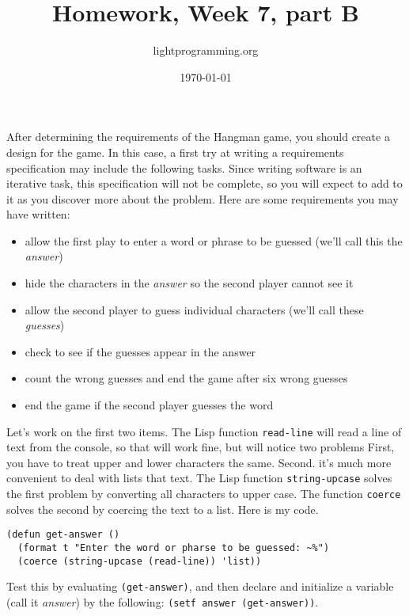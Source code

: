 \documentclass{article}
\title{Homework, Week 7, part B}
\author{lightprogramming.org}
\date{\today}
\begin{document}
\maketitle{}
\lstset{language=Lisp,numbers=left,keepspaces=false,basicstyle=\small,numberstyle=\tiny,breaklines=true,showstringspaces=false}

After determining the requirements of the Hangman game, you should create a design for the game. In this case, a first try at writing a requirements specification may include the following tasks. Since writing software is an iterative task, this specification will not be complete, so you will expect to add to it as you discover more about the problem. Here are some requirements you may have written:

\begin{itemize}
    \item allow the first play to enter a word or phrase to be guessed (we'll call this the \textit{answer})
    \item hide the characters in the \textit{answer} so the second player cannot see it
    \item allow the second player to guess individual characters (we'll call these \textit{guesses})
    \item check to see if the guesses appear in the answer
    \item count the wrong guesses and end the game after six wrong guesses
    \item end the game if the second player guesses the word
\end{itemize}

Let's work on the first two items. The Lisp function \texttt{read-line} will read a line of text from the console, so that will work fine, but will notice two problems First, you have to treat upper and lower characters the same. Second. it's much more convenient to deal with lists that text. The Lisp function \texttt{string-upcase} solves the first problem by converting all characters to upper case. The function \texttt{coerce} solves the second by coercing the text to a list. Here is my code. 

\begin{lstlisting}
(defun get-answer ()
  (format t "Enter the word or pharse to be guessed: ~%")
  (coerce (string-upcase (read-line)) 'list))
\end{lstlisting}

Test this by evaluating \texttt{(get-answer)}, and then declare and initialize a variable (call it \textit{answer}) by the following: \texttt{(setf answer (get-answer))}.
\end{document}
